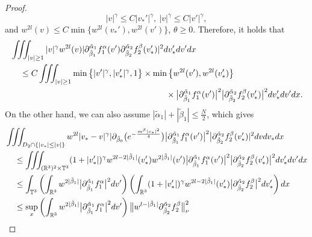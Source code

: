 \documentclass[reqno]{amsart}
\numberwithin{equation}{section}
\numberwithin{equation}{section}
\begin{document}
\begin{proof}
\begin{equation}
		|v|^\gamma \le C|v_*'|^\gamma,\ |v|^\gamma \le C|v'|^\gamma,
	\end{equation}
	and $w^{2l}(v) \le C \min\big\{w^{2l}(v_*'), w^{2l}(v')\big\}$, $\theta \ge 0$. Therefore, it holds that 
	\begin{equation*}
	\begin{aligned}
		&\iiint_{|v| \ge 1} |v|^\gamma w^{2l}(v) | \partial_{\tilde{\beta}_1}^{\tilde{\alpha}_1}f^{\alpha}_1 (v') \partial_{\tilde{\beta}_2}^{\tilde{\alpha}_2}f^{\beta}_2 (v_*') |^2 dv_*'dv'dx \\
		&\hspace{0.4cm}\le C \iiint_{|v| \ge 1} \min\big\{|v'|^\gamma, |v_*'|^\gamma, 1\big\}\times \min\big\{w^{2l}(v'), w^{2l}(v_*')\big\} \\
	 &\hspace{6.5cm}\times  \big| \partial_{\tilde{\beta}_1}^{\tilde{\alpha}_1}f^{\alpha}_1 (v')\big|^2 \big|\partial_{\tilde{\beta}_2}^{\tilde{\alpha}_2}f^{\beta}_2 (v_*') \big|^2 dv_*'dv'dx.
	\end{aligned}
	\end{equation*}
	On the other hand, we can also  assume $|\tilde{\alpha}_1| + |\tilde{\beta}_1| \leq \frac{N}{2}$, which gives
	\begin{align*}
		&\iiint_{D_2\cap \{|v_*|\leq |v|\}} w^{2l} |v_* - v|^\gamma|\partial_{\tilde{\beta}_0} \big(e^{-\frac{m^{\beta}|v_*|^2}{4}}\big) 
		\big|\partial_{\tilde{\beta}_1}^{\tilde{\alpha}_1}f^{\alpha}_1 (v')\big|^2 \big|\partial_{\tilde{\beta}_2}^{\tilde{\alpha}_2}f^{\beta}_2 (v_*') |^2
		dv dv_* dx \\
		&\hspace{0.4cm}\leq \iiint_{(\mathbb{R}^3)^2\times\mathbb{T}^3} (1 + |v_*'|)^\gamma w^{2l - 2|\tilde{\beta}_1|}(v_*') w^{2|\tilde{\beta}_1|}(v') 
		 \big| \partial_{\tilde{\beta}_1}^{\tilde{\alpha}_1}f^{\alpha}_1 (v') \big|^2 \big| \partial_{\tilde{\beta}_2}^{\tilde{\alpha}_2}f^{\beta}_2 (v_*') \big|^2 dv_*' dv' dx \\
		&\hspace{0.4cm}\leq \int_{\mathbb{T}^3} \left( \int_{\mathbb{R}^3} w^{2|\tilde{\beta}_1|} \big| \partial_{\tilde{\beta}_1}^{\tilde{\alpha}_1}f^{\alpha}_1  \big|^2 dv' \right)  \left( \int_{\mathbb{R}^3} (1 + |v_*'|)^\gamma w^{2l - 2|\tilde{\beta}_1|}(v_*') \big| \partial_{\tilde{\beta}_2}^{\tilde{\alpha}_2}f^{\beta}_2 \big|^2 dv_*' \right) dx \\
	&\hspace{0.4cm}\leq \sup_x \left( \int_{\mathbb{R}^3} w^{2|\tilde{\beta}_1|} \big| \partial_{\tilde{\beta}_1}^{\tilde{\alpha}_1}f^{\alpha}_1 \big|^2 dv' \right) \big\| w^{l - |\tilde{\beta}_1|} \partial_{\tilde{\beta}_2}^{\tilde{\alpha}_2}f^{\beta}_2 \big\|_{\nu}^2 \\

\end{align*}
\end{proof}
\end{document}
